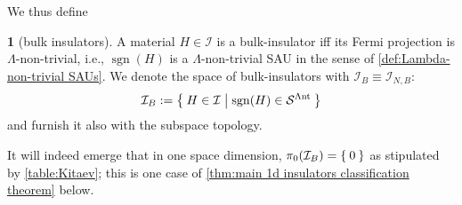 \documentclass[a4paper,10pt]{article}
\numberwithin{equation}{section}
\theoremstyle{plain}
\theoremstyle{plain}
\theoremstyle{plain}
\theoremstyle{plain}
\theoremstyle{plain}
\theoremstyle{remark}
\theoremstyle{definition}
\newtheorem{defn}[thm]{\protect\definitionname}
\theoremstyle{plain}
\providecommand{\definitionname}{Definition}
\newcommand{\calSU}{\mathcal{S}}
\newcommand{\calI}{\mathcal{I}}
\newcommand{\LamNT}{\Lambda\mathrm{nt}}
\newcommand{\LamNTSAU}{\calSU^{\LamNT}}
\newcommand{\sgn}{\operatorname{sgn}}
\newcommand{\eql}[1]{\begin{align}#1\end{align}}
\begin{document}
	We thus define 
	
	\begin{defn}[bulk insulators]\label{def:bulk insulators} A material $H\in\calI$ is a bulk-insulator iff its Fermi projection is $\Lambda$-non-trivial, i.e., $\sgn(H)$ is a $\Lambda$-non-trivial SAU in the sense of \cref{def:Lambda-non-trivial SAUs}. We denote the space of bulk-insulators with $\calI_B\equiv\calI_{N,B}$: \eql{\calI_B := \Set{H\in\calI|\sgn(H)\in\LamNTSAU}} and furnish it also with the subspace topology.
	\end{defn}
	
	
	
	It will indeed emerge that in one space dimension, $\pi_0(\calI_B)=\Set{0}$ as stipulated by \cref{table:Kitaev}; this is one case of \cref{thm:main 1d insulators classification theorem} below.
	
	
\end{document}
